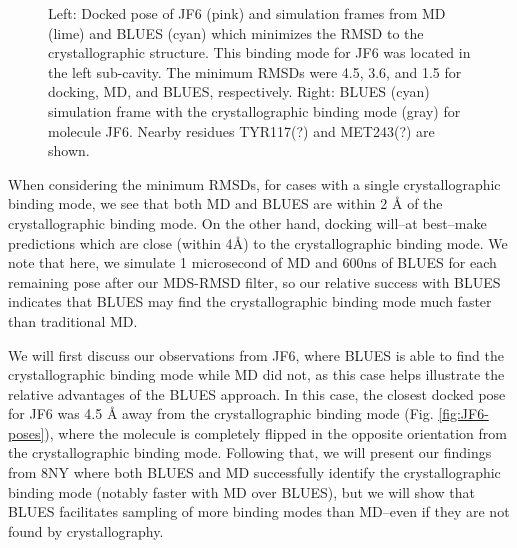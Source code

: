 \begin{figure}[!tbp]
  \centering
  \hfill
  \caption[JF6 docked poses and crystal structure]{Left: Docked pose of JF6 (pink) and simulation frames from MD (lime) and BLUES (cyan) which minimizes the RMSD to the crystallographic structure. This binding mode for JF6 was located in the left sub-cavity. The minimum RMSDs were 4.5, 3.6, and 1.5 for docking, MD, and BLUES, respectively. Right: BLUES (cyan) simulation frame with the crystallographic binding mode (gray) for molecule JF6. Nearby residues TYR117(?) and MET243(?) are shown.}
\end{figure}

When considering the minimum RMSDs, for cases with a single crystallographic binding mode, we see that both MD and BLUES are within 2 {\AA} of the crystallographic binding mode.
On the other hand, docking will--at best--make predictions which are close (within 4{\AA}) to the crystallographic binding mode.
We note that here, we simulate 1 microsecond of MD and 600ns of BLUES for each remaining pose after our MDS-RMSD filter, so our relative success with BLUES indicates that BLUES may find the crystallographic binding mode much faster than traditional MD.

We will first discuss our observations from JF6, where BLUES is able to find the crystallographic binding mode while MD did not, as this case helps illustrate the relative advantages of the BLUES approach.
In this case, the closest docked pose for JF6 was 4.5 {\AA} away from the crystallographic binding mode (Fig. \ref{fig:JF6-poses}), where the molecule is completely flipped in the opposite orientation from the crystallographic binding mode.
Following that, we will present our findings from 8NY where both BLUES and MD successfully identify the crystallographic binding mode (notably faster with MD over BLUES), but we will show that BLUES facilitates sampling of more binding modes than MD--even if they are not found by crystallography.

